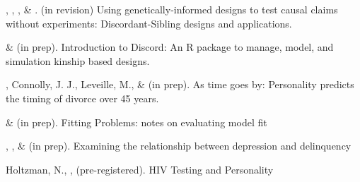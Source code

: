 



\item \meb, \jt, \yrh, \& \joe. (in revision) Using genetically-informed designs to test causal claims without experiments: Discordant-Sibling designs and applications. \href{https://osf.io/zpdwt/}{\small\color{blue}{osf.io/zpdwt/}}%

\item \jt \& \meb (in prep). Introduction to Discord: An R package to manage, model, and simulation kinship based designs.

\item \meb, Connolly, J. J., Leveille, M., \& \jjj (in prep). As time goes by: Personality predicts the timing of divorce over 45 years.%

\item \meb \& \joe (in prep). Fitting Problems: notes on evaluating model fit
%
\item \emsims, \jt, \& \meb (in prep). Examining the relationship between depression and delinquency



\item Holtzman, N., \meb, \etal (pre-registered). HIV Testing and Personality






